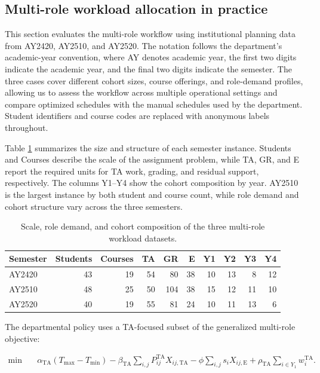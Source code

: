 \subsection{Multi-role workload allocation in practice}\label{multi-role-workload-allocation-in-practice}

This section evaluates the multi-role workflow using institutional
planning data from AY2420, AY2510, and AY2520. The notation
follows the department's academic-year convention, where AY denotes academic
year, the first two digits indicate the academic year, and the final two digits
indicate the semester. The three cases cover different cohort sizes, course offerings,
and role-demand profiles, allowing us to assess the workflow across multiple
operational settings and compare optimized schedules with the manual schedules
used by the department. Student identifiers and course codes are replaced with
anonymous labels throughout.

Table \ref{tab:multi-role-dataset-summary} summarizes the size and
structure of each semester instance. Students and Courses describe
the scale of the assignment problem, while TA, GR, and E report the
required units for TA work, grading, and residual support,
respectively. The columns Y1--Y4 show the cohort
composition by year. AY2510 is the largest instance by both student
and course count, while role demand and cohort structure vary across
the three semesters.

\begin{table}[!h]

\caption{\label{tab:multi-role-dataset-summary}Scale, role demand, and cohort composition of the three multi-role workload datasets.}
\centering
\begin{tabular}[t]{l|r|r|r|r|r|r|r|r|r}
\hline
Semester & Students & Courses & TA & GR & E & Y1 & Y2 & Y3 & Y4\\
\hline
AY2420 & 43 & 19 & 54 & 80 & 38 & 10 & 13 & 8 & 12\\
\hline
AY2510 & 48 & 25 & 50 & 104 & 38 & 15 & 12 & 11 & 10\\
\hline
AY2520 & 40 & 19 & 55 & 81 & 24 & 10 & 11 & 13 & 6\\
\hline
\end{tabular}
\end{table}

The departmental policy uses a TA-focused subset of the generalized multi-role
objective:

\[
\begin{aligned}
\min\quad
&\alpha_{\mathrm{TA}}(T_{\max}-T_{\min})
-\beta_{\mathrm{TA}}\sum_{i,j}
P^{\mathrm{TA}}_{ij}X_{ij,\mathrm{TA}}
-\phi\sum_{i,j}s_iX_{ij,\mathrm{E}}
+\rho_{\mathrm{TA}}\sum_{i\in Y_1}w_i^{\mathrm{TA}}.
\end{aligned}\tag{16}
\]

